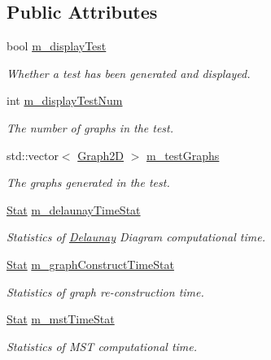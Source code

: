 \subsection*{Public Attributes}
\begin{DoxyCompactItemize}
\item 
bool \hyperlink{structcmst_1_1_window_1_1_test_a6e01140b018e7c479b15ae6499d8b9e8}{m\_displayTest}
\begin{DoxyCompactList}\small\item\em Whether a test has been generated and displayed. \end{DoxyCompactList}\item 
int \hyperlink{structcmst_1_1_window_1_1_test_a0968826c727c33df28c160c4095e0b2f}{m\_displayTestNum}
\begin{DoxyCompactList}\small\item\em The number of graphs in the test. \end{DoxyCompactList}\item 
std::vector$<$ \hyperlink{classcmst_1_1_graph2_d}{Graph2D} $>$ \hyperlink{structcmst_1_1_window_1_1_test_a42f44814c524399a3c1f547a64218c1a}{m\_testGraphs}
\begin{DoxyCompactList}\small\item\em The graphs generated in the test. \end{DoxyCompactList}\item 
\hyperlink{classcmst_1_1_stat}{Stat} \hyperlink{structcmst_1_1_window_1_1_test_a6f0ad01079d1c5b149282e31db771772}{m\_delaunayTimeStat}
\begin{DoxyCompactList}\small\item\em Statistics of \hyperlink{class_delaunay}{Delaunay} Diagram computational time. \end{DoxyCompactList}\item 
\hyperlink{classcmst_1_1_stat}{Stat} \hyperlink{structcmst_1_1_window_1_1_test_a4ff72191889ff43d7d80517120a97fae}{m\_graphConstructTimeStat}
\begin{DoxyCompactList}\small\item\em Statistics of graph re-\/construction time. \end{DoxyCompactList}\item 
\hyperlink{classcmst_1_1_stat}{Stat} \hyperlink{structcmst_1_1_window_1_1_test_a103594f227a761c33c06b8dd68713c18}{m\_mstTimeStat}
\begin{DoxyCompactList}\small\item\em Statistics of MST computational time. \end{DoxyCompactList}\end{DoxyCompactItemize}



